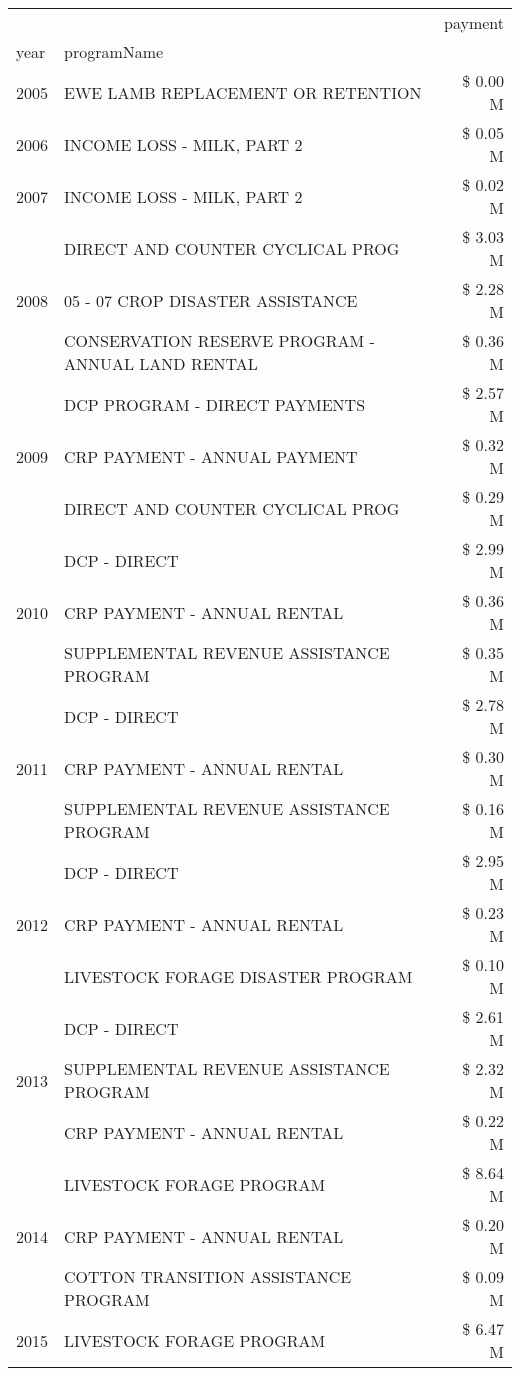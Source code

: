\begin{tabular}{llr}
\toprule
 &  & payment \\
year & programName &  \\
\midrule
2005 & EWE LAMB REPLACEMENT OR RETENTION & \$ 0.00 M \\
\cline{1-3}
2006 & INCOME LOSS - MILK, PART 2 & \$ 0.05 M \\
\cline{1-3}
2007 & INCOME LOSS - MILK, PART 2 & \$ 0.02 M \\
\cline{1-3}
\multirow[t]{3}{*}{2008} & DIRECT AND COUNTER CYCLICAL PROG & \$ 3.03 M \\
 & 05 - 07 CROP DISASTER ASSISTANCE & \$ 2.28 M \\
 & CONSERVATION RESERVE PROGRAM - ANNUAL LAND RENTAL & \$ 0.36 M \\
\cline{1-3}
\multirow[t]{3}{*}{2009} & DCP PROGRAM - DIRECT PAYMENTS & \$ 2.57 M \\
 & CRP PAYMENT - ANNUAL PAYMENT & \$ 0.32 M \\
 & DIRECT AND COUNTER CYCLICAL PROG & \$ 0.29 M \\
\cline{1-3}
\multirow[t]{3}{*}{2010} & DCP - DIRECT & \$ 2.99 M \\
 & CRP PAYMENT - ANNUAL RENTAL & \$ 0.36 M \\
 & SUPPLEMENTAL REVENUE ASSISTANCE PROGRAM & \$ 0.35 M \\
\cline{1-3}
\multirow[t]{3}{*}{2011} & DCP - DIRECT & \$ 2.78 M \\
 & CRP PAYMENT - ANNUAL RENTAL & \$ 0.30 M \\
 & SUPPLEMENTAL REVENUE ASSISTANCE PROGRAM & \$ 0.16 M \\
\cline{1-3}
\multirow[t]{3}{*}{2012} & DCP - DIRECT & \$ 2.95 M \\
 & CRP PAYMENT - ANNUAL RENTAL & \$ 0.23 M \\
 & LIVESTOCK FORAGE DISASTER PROGRAM & \$ 0.10 M \\
\cline{1-3}
\multirow[t]{3}{*}{2013} & DCP - DIRECT & \$ 2.61 M \\
 & SUPPLEMENTAL REVENUE ASSISTANCE PROGRAM & \$ 2.32 M \\
 & CRP PAYMENT - ANNUAL RENTAL & \$ 0.22 M \\
\cline{1-3}
\multirow[t]{3}{*}{2014} & LIVESTOCK FORAGE PROGRAM & \$ 8.64 M \\
 & CRP PAYMENT - ANNUAL RENTAL & \$ 0.20 M \\
 & COTTON TRANSITION ASSISTANCE PROGRAM & \$ 0.09 M \\
\cline{1-3}
\multirow[t]{3}{*}{2015} & LIVESTOCK FORAGE PROGRAM & \$ 6.47 M \\

\end{tabular}
